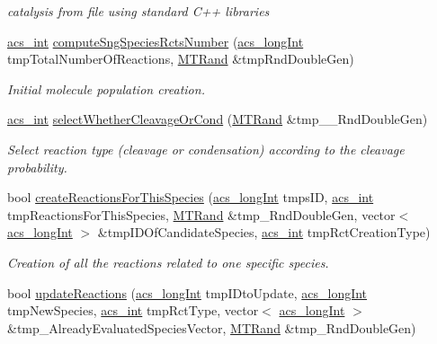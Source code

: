 \begin{DoxyCompactItemize}
\begin{DoxyCompactList}\small\item\em catalysis from file using standard C++ libraries \end{DoxyCompactList}\item 
\hyperlink{a00016_a8d277355641a098190360234e2ebde35}{acs\-\_\-int} \hyperlink{a00003_a0fd3cb062d35d2f6dd8961e95dd477b7}{compute\-Sng\-Species\-Rcts\-Number} (\hyperlink{a00016_a19319d75f02db4308bc5c0026d98cd85}{acs\-\_\-long\-Int} tmp\-Total\-Number\-Of\-Reactions, \hyperlink{a00008}{M\-T\-Rand} \&tmp\-Rnd\-Double\-Gen)
\begin{DoxyCompactList}\small\item\em Initial molecule population creation. \end{DoxyCompactList}\item 
\hyperlink{a00016_a8d277355641a098190360234e2ebde35}{acs\-\_\-int} \hyperlink{a00003_a53282cca8882e86652ab0a22e6966d17}{select\-Whether\-Cleavage\-Or\-Cond} (\hyperlink{a00008}{M\-T\-Rand} \&tmp\-\_\-\-\_\-\-Rnd\-Double\-Gen)
\begin{DoxyCompactList}\small\item\em Select reaction type (cleavage or condensation) according to the cleavage probability. \end{DoxyCompactList}\item 
bool \hyperlink{a00003_a76794f37d6d94b7504c58f0f4a4709ca}{create\-Reactions\-For\-This\-Species} (\hyperlink{a00016_a19319d75f02db4308bc5c0026d98cd85}{acs\-\_\-long\-Int} tmps\-I\-D, \hyperlink{a00016_a8d277355641a098190360234e2ebde35}{acs\-\_\-int} tmp\-Reactions\-For\-This\-Species, \hyperlink{a00008}{M\-T\-Rand} \&tmp\-\_\-\-Rnd\-Double\-Gen, vector$<$ \hyperlink{a00016_a19319d75f02db4308bc5c0026d98cd85}{acs\-\_\-long\-Int} $>$ \&tmp\-I\-D\-Of\-Candidate\-Species, \hyperlink{a00016_a8d277355641a098190360234e2ebde35}{acs\-\_\-int} tmp\-Rct\-Creation\-Type)
\begin{DoxyCompactList}\small\item\em Creation of all the reactions related to one specific species. \end{DoxyCompactList}\item 
bool \hyperlink{a00003_ace92235425bfbe692e3873ba5bb07639}{update\-Reactions} (\hyperlink{a00016_a19319d75f02db4308bc5c0026d98cd85}{acs\-\_\-long\-Int} tmp\-I\-Dto\-Update, \hyperlink{a00016_a19319d75f02db4308bc5c0026d98cd85}{acs\-\_\-long\-Int} tmp\-New\-Species, \hyperlink{a00016_a8d277355641a098190360234e2ebde35}{acs\-\_\-int} tmp\-Rct\-Type, vector$<$ \hyperlink{a00016_a19319d75f02db4308bc5c0026d98cd85}{acs\-\_\-long\-Int} $>$ \&tmp\-\_\-\-Already\-Evaluated\-Species\-Vector, \hyperlink{a00008}{M\-T\-Rand} \&tmp\-\_\-\-Rnd\-Double\-Gen)

\end{DoxyCompactItemize}
